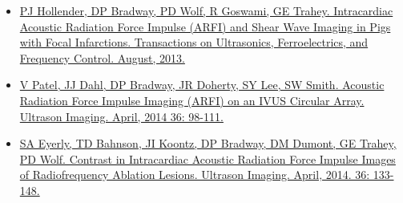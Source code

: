\documentclass[letterpaper,10pt,english]{sphinxmanual}
\begin{document}
\begin{itemize}
\item {} 
\href{http://dx.doi.org/10.1109/TUFFC.2013.2749}{PJ Hollender, DP Bradway, PD Wolf, R Goswami, GE Trahey.
Intracardiac Acoustic Radiation Force Impulse (ARFI) and Shear Wave
Imaging in Pigs with Focal Infarctions. Transactions on Ultrasonics,
Ferroelectrics, and Frequency Control. August,
2013.}

\item {} 
\href{http://dx.doi.org/10.1177/0161734613511595}{V Patel, JJ Dahl, DP Bradway, JR Doherty, SY Lee, SW Smith. Acoustic
Radiation Force Impulse Imaging (ARFI) on an IVUS Circular Array.
Ultrason Imaging. April, 2014 36:
98-111.}

\item {} 
\href{http://dx.doi.org/10.1177/0161734613519602}{SA Eyerly, TD Bahnson, JI Koontz, DP Bradway, DM Dumont, GE Trahey,
PD Wolf. Contrast in Intracardiac Acoustic Radiation Force Impulse
Images of Radiofrequency Ablation Lesions. Ultrason Imaging. April,
2014. 36: 133-148.}

\end{itemize}
\end{document}
